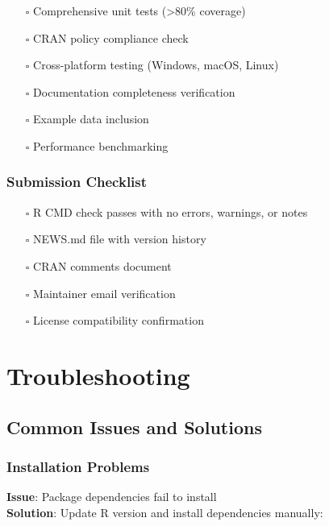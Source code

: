 \documentclass[
  11pt,
]{article}
\providecommand{\tightlist}{%
  \setlength{\itemsep}{0pt}\setlength{\parskip}{0pt}}
\begin{document}
\begin{itemize}
\tightlist
\item[$\square$]
  Comprehensive unit tests (\textgreater80\% coverage)
\item[$\square$]
  CRAN policy compliance check
\item[$\square$]
  Cross-platform testing (Windows, macOS, Linux)
\item[$\square$]
  Documentation completeness verification
\item[$\square$]
  Example data inclusion
\item[$\square$]
  Performance benchmarking
\end{itemize}

\subsubsection{Submission Checklist}\label{submission-checklist}

\begin{itemize}
\tightlist
\item[$\square$]
  R CMD check passes with no errors, warnings, or notes
\item[$\square$]
  NEWS.md file with version history
\item[$\square$]
  CRAN comments document
\item[$\square$]
  Maintainer email verification
\item[$\square$]
  License compatibility confirmation
\end{itemize}

\newpage

\section{Troubleshooting}\label{troubleshooting}

\subsection{Common Issues and
Solutions}\label{common-issues-and-solutions}

\subsubsection{Installation Problems}\label{installation-problems}

\textbf{Issue}: Package dependencies fail to install\\
\textbf{Solution}: Update R version and install dependencies manually:
\end{document}
